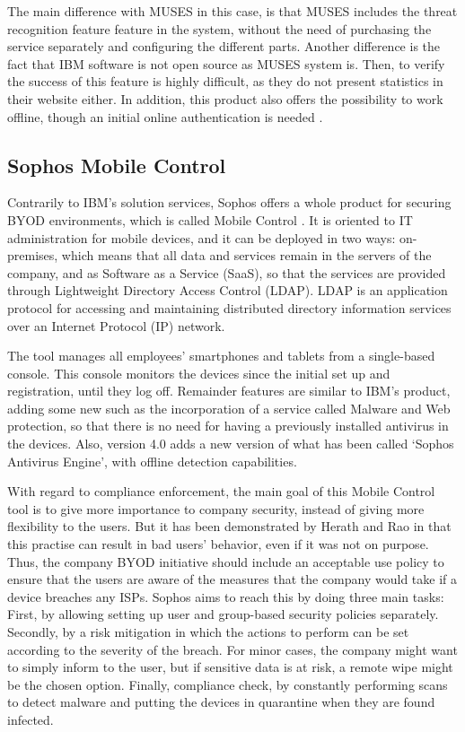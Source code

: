 The main difference with MUSES in this case, is that MUSES includes the threat recognition feature feature in the system, without the need of purchasing the service separately and configuring the different parts. Another difference is the fact that IBM software is not open source as MUSES system is. Then, to verify the success of this feature is highly difficult, as they do not present statistics in their website either. In addition, this product also offers the possibility to work offline, though an initial online authentication is needed \cite{mobFirstAuth}. 
 

\subsection{Sophos Mobile Control}
\label{subsec:sophos}

Contrarily to IBM's solution services, Sophos offers a whole product for securing BYOD environments, which is called Mobile Control \cite{Sophos_tool}. It is oriented to IT administration for mobile devices, and it can be deployed in two ways: on-premises, which means that all data and services remain in the servers of the company, and as Software as a Service (SaaS), so that the services are provided through Lightweight Directory Access Control (LDAP). LDAP is an application protocol for accessing and maintaining distributed directory information services over an Internet Protocol (IP) network.

The tool manages all employees' smartphones and tablets from a single-based console. This console monitors the devices since the initial set up and registration, until they log off. Remainder features are similar to IBM's product, adding some new such as the incorporation of a service called Malware and Web protection, so that there is no need for having a previously installed antivirus in the devices. Also, version 4.0 adds a new version of what has been called `Sophos Antivirus Engine', with offline detection capabilities.

With regard to compliance enforcement, the main goal of this Mobile Control tool is to give more importance to company security, instead of giving more flexibility to the users. But it has been demonstrated by Herath and Rao in \cite{SecPolPenalty09} that this practise can result in bad users' behavior, even if it was not on purpose. Thus, the company BYOD initiative should include an acceptable use policy to ensure that the users are aware of the measures that the company would take if a device breaches any ISPs. Sophos aims to reach this by doing three main tasks: First, by allowing setting up user and group-based security policies separately. Secondly, by a risk mitigation in which the actions to perform can be set according to the severity of the breach. For minor cases, the company might want to simply inform to the user, but if sensitive data is at risk, a remote wipe might be the chosen option. Finally, compliance check, by constantly performing scans to detect malware and putting the devices in quarantine when they are found infected.

